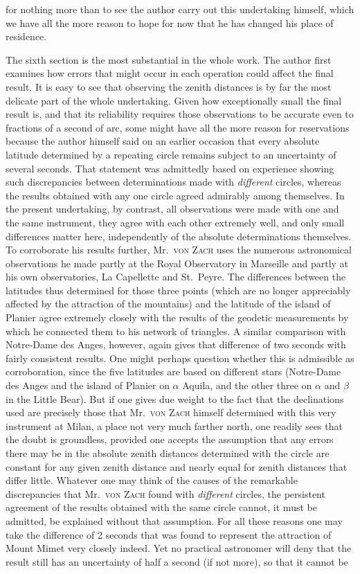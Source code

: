for nothing more than to see the author carry out this undertaking himself, which we have all the more reason to hope for now that he has changed his place of residence.

The sixth section is the most substantial in the whole work. The author first examines how errors that might occur in each operation could affect the final result. It is easy to see that observing the zenith distances is by far the most delicate part of the whole undertaking. Given how exceptionally small the final result is, and that its reliability requires those observations to be accurate even to fractions of a second of arc, some might have all the more reason for reservations because the author himself said on an earlier occasion that every absolute latitude determined by a repeating circle remains subject to an uncertainty of several seconds. That statement was admittedly based on experience showing such discrepancies between determinations made with \emph{different} circles, whereas the results obtained with any one circle agreed admirably among themselves. In the present undertaking, by contrast, all observations were made with one and the same instrument, they agree with each other extremely well, and only small differences matter here, independently of the absolute determinations themselves. To corroborate his results further, Mr.\ \textsc{von Zach} uses the numerous astronomical observations he made partly at the Royal Observatory in Marseille and partly at his own observatories, La Capellette and St.\ Peyre. The differences between the latitudes thus determined for those three points (which are no longer appreciably affected by the attraction of the mountains) and the latitude of the island of Planier agree extremely closely with the results of the geodetic measurements by which he connected them to his network of triangles. A similar comparison with Notre-Dame des Anges, however, again gives that difference of two seconds with fairly consistent results. One might perhaps question whether this is admissible as corroboration, since the five latitudes are based on different stars (Notre-Dame des Anges and the island of Planier on $\alpha$ Aquila, and the other three on $\alpha$ and $\beta$ in the Little Bear). But if one gives due weight to the fact that the declinations used are precisely those that Mr.\ \textsc{von Zach} himself determined with this very instrument at Milan, a place not very much farther north, one readily sees that the doubt is groundless, provided one accepts the assumption that any errors there may be in the absolute zenith distances determined with the circle are constant for any given zenith distance and nearly equal for zenith distances that differ little. Whatever one may think of the causes of the remarkable discrepancies that Mr.\ \textsc{von Zach} found with \emph{different} circles, the persistent agreement of the results obtained with the same circle cannot, it must be admitted, be explained without that assumption. For all these reasons one may take the difference of 2 seconds that was found to represent the attraction of Mount Mimet very closely indeed. Yet no practical astronomer will deny that the result still has an uncertainty of half a second (if not more), so that it cannot be 